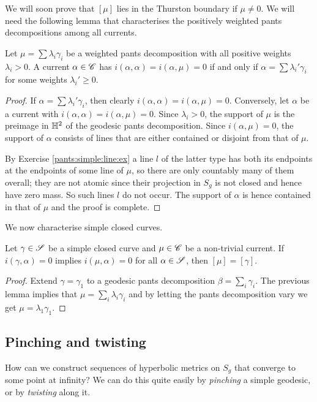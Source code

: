 We will soon prove that $[\mu]$ lies in the Thurston boundary if $\mu\neq 0$. We will need the following lemma that characterises the positively weighted pants decompositions among all currents.

\begin{lemma}
Let $\mu = \sum \lambda_i\gamma_i$ be a weighted pants decomposition with all positive weights $\lambda_i>0$. A current $\alpha \in \mathscr{C}$ has $i(\alpha,\alpha) = i(\alpha,\mu)=0$ if and only if $\alpha = \sum \lambda_i'\gamma_i$ for some weights $\lambda_i'\geqslant 0$.
\end{lemma}
\begin{proof}
If $\alpha = \sum \lambda_i'\gamma_i$, then clearly $i(\alpha,\alpha) = i(\alpha,\mu)=0$. Conversely, let $\alpha$ be a current with $i(\alpha,\alpha) = i(\alpha, \mu)=0$. Since $\lambda_i>0$, the support of $\mu$ is the preimage in $\mathbb{H}^2$ of the geodesic pants decomposition. Since $i(\alpha, \mu)=0$, the support of $\alpha$ consists of lines that are either contained or disjoint from that of $\mu$. 

By Exercise \ref{pants:simple:line:ex} a line $l$ of the latter type has both its endpoints at the endpoints of some line of $\mu$, so there are only countably many of them overall; they are not atomic since their projection in $S_g$ is not closed and hence have zero mass. So such lines $l$ do not occur. The support of $\alpha$ is hence contained in that of $\mu$ and the proof is complete.
\end{proof}

We now characterise simple closed curves.

\begin{lemma} \label{characterize:S:lemma}
Let $\gamma\in\mathscr{S}$ be a simple closed curve and $\mu\in\mathscr{C}$ be a non-trivial current. If $i(\gamma,\alpha)=0$ implies $i(\mu,\alpha)=0$ for all $\alpha\in\mathscr{S}$, then $[\mu] = [\gamma]$.
\end{lemma}
\begin{proof}
Extend $\gamma=\gamma_1$ to a geodesic pants decomposition $\beta = \sum_i\gamma_i$. The previous lemma implies that $\mu = \sum_i\lambda_i\gamma_i$ and by letting the pants decomposition vary we get $\mu = \lambda_1\gamma_1$.
\end{proof}

\subsection{Pinching and twisting} \label{pinching:twisting:subsection}
How can we construct sequences of hyperbolic metrics on $S_g$ that converge to some point at infinity? We can do this quite easily by \emph{pinching} a simple geodesic, or by \emph{twisting} along it. 

